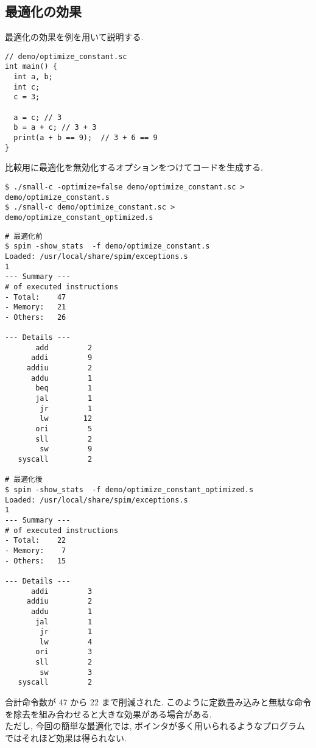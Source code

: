 \documentclass[a4j]{jarticle}
\begin{document}
\subsection{最適化の効果}
最適化の効果を例を用いて説明する. \\

\begin{verbatim}
// demo/optimize_constant.sc
int main() {
  int a, b;
  int c;
  c = 3;

  a = c; // 3
  b = a + c; // 3 + 3
  print(a + b == 9);  // 3 + 6 == 9
}
\end{verbatim}

比較用に最適化を無効化するオプションをつけてコードを生成する.

\begin{verbatim}
$ ./small-c -optimize=false demo/optimize_constant.sc > demo/optimize_constant.s
$ ./small-c demo/optimize_constant.sc > demo/optimize_constant_optimized.s
\end{verbatim}

\begin{verbatim}
# 最適化前
$ spim -show_stats  -f demo/optimize_constant.s
Loaded: /usr/local/share/spim/exceptions.s
1
--- Summary ---
# of executed instructions
- Total:    47
- Memory:   21
- Others:   26

--- Details ---
       add         2
      addi         9
     addiu         2
      addu         1
       beq         1
       jal         1
        jr         1
        lw        12
       ori         5
       sll         2
        sw         9
   syscall         2

# 最適化後
$ spim -show_stats  -f demo/optimize_constant_optimized.s
Loaded: /usr/local/share/spim/exceptions.s
1
--- Summary ---
# of executed instructions
- Total:    22
- Memory:    7
- Others:   15

--- Details ---
      addi         3
     addiu         2
      addu         1
       jal         1
        jr         1
        lw         4
       ori         3
       sll         2
        sw         3
   syscall         2

\end{verbatim}

合計命令数が 47 から 22 まで削減された. このように定数畳み込みと無駄な命令を除去を組み合わせると大きな効果がある場合がある. \\

ただし, 今回の簡単な最適化では, ポインタが多く用いられるようなプログラムではそれほど効果は得られない.
\end{document}
